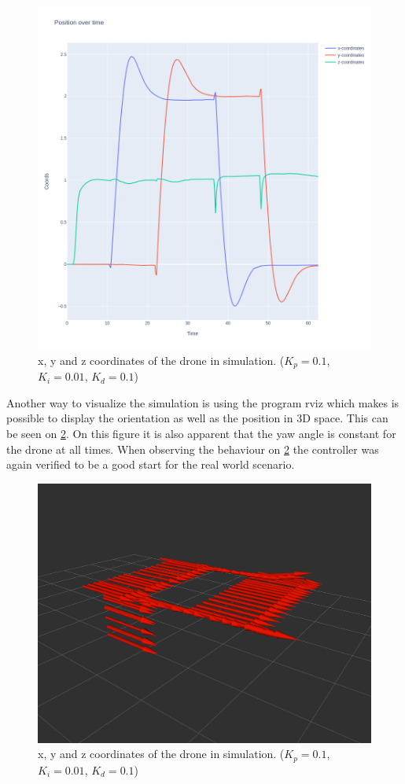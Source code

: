 \documentclass[conference]{IEEEtran}
\begin{document}
\begin{figure}[hbtp]
	\centering
	\includegraphics[width=1.0\linewidth]{images/task2_sim_pos.png}
	\caption{x, y and z coordinates of the drone in simulation. ($K_p = 0.1$, $K_i = 0.01$, $K_d = 0.1$)}
	\label{fig:sim_pos}
\end{figure}

Another way to visualize the simulation is using the program rviz which makes is possible to display the orientation as well as the position in 3D space. This can be seen on \cref{fig:sim_rviz}. On this figure it is also apparent that the yaw angle is constant for the drone at all times. When observing the behaviour on \cref{fig:sim_rviz} the controller was again verified to be a good start for the real world scenario.

\begin{figure}[hbtp]
	\centering
	\includegraphics[width=1.0\linewidth]{images/task2_sim_rviz.png}
	\caption{x, y and z coordinates of the drone in simulation. ($K_p = 0.1$, $K_i = 0.01$, $K_d = 0.1$)}
	\label{fig:sim_rviz}
\end{figure}
\end{document}
